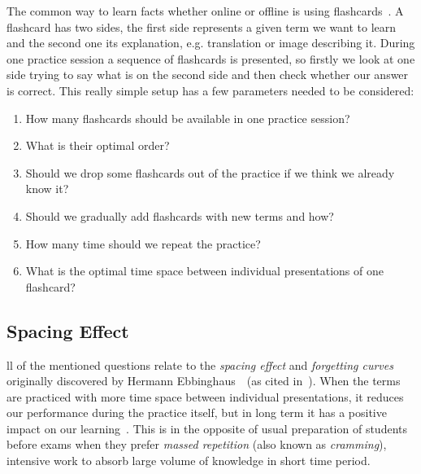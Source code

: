 \documentclass[table,color]{fithesis3/fithesis3}
\begin{document}
The common way to learn facts whether online or offline is using
flashcards~\cite{kornell2008optimising}. A flashcard has two sides, the first
side represents a given term we want to learn and the second one its
explanation, e.g. translation or image describing it.  During one practice
session a sequence of flashcards is presented, so firstly we look at one side
trying to say what is on the second side and then check whether our answer is
correct. This really simple setup has a few parameters needed to be considered:

\begin{enumerate}
	\item How many flashcards should be available in one practice session?
	\item What is their optimal order?
	\item Should we drop some flashcards out of the practice if we think we already know it?
	\item Should we gradually add flashcards with new terms and how?
	\item How many time should we repeat the practice?
	\item What is the optimal time space between individual presentations of one flashcard?
\end{enumerate}

\subsection{Spacing Effect}
\label{section:spacing_effect}
ll of the mentioned questions relate to the \emph{spacing
effect} and \emph{forgetting curves} originally discovered by Hermann
Ebbinghaus~\cite{ebbinghaus1885spacing}~(as cited
in~\cite{pavlik2005practice}). When the terms are practiced with more time
space between individual presentations, it reduces our performance during the
practice itself, but in long term it has a positive impact on our
learning~\cite{maass2015how, kornell2009optimising}. This is in the opposite of
usual preparation of students before exams when they prefer \emph{massed
repetition} (also known as \emph{cramming}), intensive work to absorb large
volume of knowledge in short time period.
\end{document}
